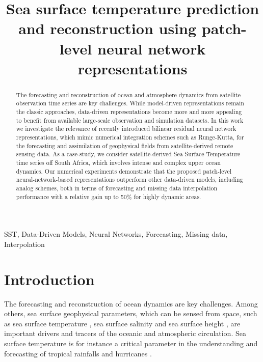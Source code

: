 \documentclass{article}
\title{Sea surface temperature prediction and reconstruction using patch-level neural network representations}
\begin{document}
%
\maketitle
%
\begin{abstract}
The forecasting and reconstruction of ocean and atmosphere dynamics from satellite observation time series are key challenges. 
While model-driven representations remain the classic approaches, data-driven representations become more and more appealing to benefit from available large-scale observation and simulation datasets.  
In this work we investigate the relevance of recently introduced bilinear residual neural network representations, which mimic numerical integration schemes such as Runge-Kutta, for the forecasting and assimilation of geophysical fields from satellite-derived remote sensing data. As a case-study, we consider satellite-derived Sea Surface Temperature time series off South Africa, which involves intense and complex upper ocean dynamics. Our numerical experiments demonstrate that the proposed patch-level neural-network-based representations outperform other data-driven models, including analog schemes, both in terms of forecasting and missing data interpolation performance with a relative gain up to 50\% for highly dynamic areas.
\end{abstract}
%
\begin{keywords}
SST, Data-Driven Models, Neural Networks, Forecasting, Missing data, Interpolation
\end{keywords}
%
\section{Introduction}
\label{sec:intro}
The forecasting and reconstruction of ocean dynamics are key challenges. Among others, sea surface geophysical parameters, which can be sensed from space, such as sea surface temperature \cite{chelton_global_2005}, sea surface salinity \cite{klemas_remote_2011} and sea surface height \cite{chelton_chapter_2001}, are important drivers and tracers of the oceanic and atmospheric circulation. Sea surface temperature is for instance a critical parameter in the understanding and forecasting of tropical rainfalls and hurricanes \cite{nobre_variations_1996}.
\end{document}
